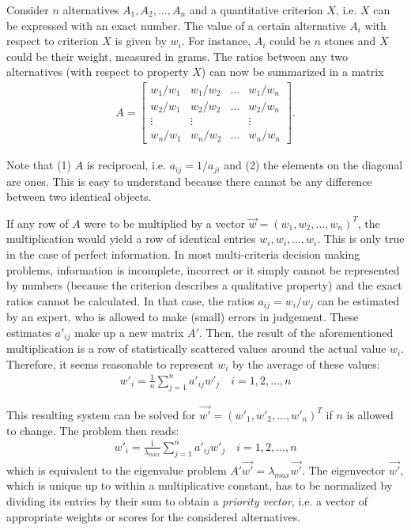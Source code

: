 Consider $n$ alternatives $A_1, A_2, \ldots, A_n$ and a quantitative criterion $X$, i.e. $X$ can be expressed with an exact number. The value of a certain alternative $A_i$ with respect to criterion $X$ is given by $w_i$. For instance, $A_i$ could be $n$ stones and $X$ could be their weight, measured in grams. The ratios between any two alternatives (with respect to property $X$) can now be summarized in a matrix
\begin{gather*}
    A = %
    \begin{bmatrix}
        w_1/w_1 & w_1/w_2 & \ldots & w_1/w_n \\
        w_2/w_1 & w_2/w_2 & \ldots & w_2/w_n \\
        \vdots  & \vdots  &        & \vdots  \\
        w_n/w_1 & w_n/w_2 & \ldots & w_n/w_n    
    \end{bmatrix}.
\end{gather*}

Note that (1) $A$ is reciprocal, i.e. $a_{ij} = 1 / a_{ji}$ and (2) the elements on the diagonal are ones. This is easy to understand because there cannot be any difference between two identical objects.

If any row of $A$ were to be multiplied by a vector $\vec{w} = (w_1, w_2, \ldots, w_n)^T$, the multiplication would yield a row of identical entries $w_i, w_i, \ldots, w_i$. This is only true in the case of perfect information. In most multi-criteria decision making problems, information is incomplete, incorrect or it simply cannot be represented by numbers (because the criterion describes a qualitative property) and the exact ratios cannot be calculated. In that case, the ratios $a_{ij} = w_i/w_j$ can be estimated by an expert, who is allowed to make (small) errors in judgement. These estimates $a'_{ij}$ make up a new matrix $A'$. Then, the result of the aforementioned multiplication is a row of statistically scattered values around the actual value $w_i$. Therefore, it seems reasonable to represent $w_i$ by the average of these values:
\begin{gather*}
    w'_i = \frac{1}{n} \sum_{j=1}^{n} a'_{ij} w'_j \quad i = 1, 2, \ldots, n
\end{gather*}

This resulting system can be solved for $\vec{w'} = (w'_1, w'_2, \ldots, w'_n)^T$ if $n$ is allowed to change. The problem then reads:
\begin{gather*}
    w'_i = \frac{1}{\lambda_{max}} \sum_{j=1}^{n} a'_{ij} w'_j \quad i = 1, 2, \ldots, n
\end{gather*}
which is equivalent to the eigenvalue problem $A' \vec{w'} = \lambda_{max} \vec{w'}$. The eigenvector $\vec{w'}$, which is unique up to within a multiplicative constant, has to be normalized by dividing its entries by their sum to obtain a \emph{priority vector}, i.e. a vector of appropriate weights or scores for the considered alternatives. 

